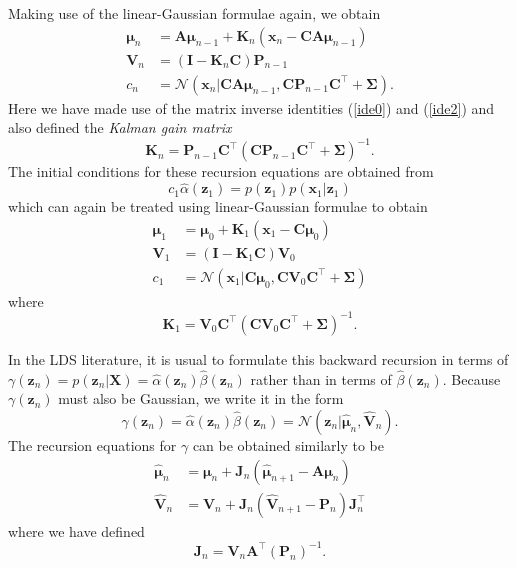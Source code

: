 \documentclass[a4paper]{report}
\renewcommand{\bf}{\mathbf}
\renewcommand{\cal}{\mathcal}
\newcommand{\imp}[1]{{\color{blue}\textit{#1}}}
\newcommand{\bs}{\boldsymbol}
\begin{document}
Making use of the linear-Gaussian formulae again, we obtain
\begin{align}
	\bs{\mu}_n &= \bf{A} \bs{\mu}_{n-1} + \bf{K}_n (\bf{x}_n - \bf{CA}\bs{\mu}_{n-1}) \\
	\bf{V}_n &= (\bf{I}-\bf{K}_n \bf{C})\bf{P}_{n-1} \\
	c_n &= \cal{N}(\bf{x}_n|\bf{CA}\bs{\mu}_{n-1},\bf{CP}_{n-1}\bf{C}^{\intercal} + \bs{\Sigma}).
\end{align}
Here we have made use of the matrix inverse identities (\ref{ide0}) and (\ref{ide2}) and also defined the \imp{Kalman gain matrix}
\begin{equation}
	\bf{K}_n = \bf{P}_{n-1} \bf{C}^{\intercal}(\bf{CP}_{n-1}\bf{C}^{\intercal} + \bs{\Sigma})^{-1}.
\end{equation}
The initial conditions for these recursion equations are obtained from
\begin{equation}
	c_1\hat{\alpha}(\bf{z}_1) = p(\bf{z}_1)p(\bf{x}_1|\bf{z}_1)
\end{equation}
which can again be treated using linear-Gaussian formulae to obtain
\begin{align}
	\bs{\mu}_1 &= \bs{\mu}_0 + \bf{K}_1 (\bf{x}_1-\bf{C}\bs{\mu}_0) \\
	\bf{V}_1 &= (\bf{I}-\bf{K}_1\bf{C})\bf{V}_0 \\
	c_1 &= \cal{N}(\bf{x}_1|\bf{C}\bs{\mu}_0,\bf{CV}_0\bf{C}^{\intercal}+\bs{\Sigma})
\end{align}
where
\begin{equation}
	\bf{K}_1 = \bf{V}_0\bf{C}^{\intercal}(\bf{CV}_0\bf{C}^{\intercal}+\bs{\Sigma})^{-1}.
\end{equation}

In the LDS literature, it is usual to formulate this backward recursion in terms of $\gamma(\bf{z}_n) = p(\bf{z}_n|\bf{X})= \hat{\alpha}(\bf{z}_n)\hat{\beta}(\bf{z}_n)$ rather than in terms of $\hat{\beta}(\bf{z}_n)$. Because $\gamma(\bf{z}_n)$ must also be Gaussian, we write it in the form
\begin{equation}
	\gamma(\bf{z}_n) = \hat{\alpha}(\bf{z}_n)\hat{\beta}(\bf{z}_n)=\cal{N}(\bf{z}_n|\hat{\bs{\mu}}_n,\hat{\bf{V}}_n).
\end{equation}
The recursion equations for $\gamma$ can be obtained similarly to be
\begin{align}
	\hat{\bs{\mu}}_n &= \bs{\mu}_n + \bf{J}_n (\hat{\bs{\mu}}_{n+1}-\bf{A}\bs{\mu}_n) \\
	\hat{\bf{V}}_n &= \bf{V}_n + \bf{J}_n(\hat{\bf{V}}_{n+1}-\bf{P}_n)\bf{J}_n^{\intercal}
\end{align}
where we have defined
\begin{equation}
	\bf{J}_n = \bf{V}_n \bf{A}^{\intercal} (\bf{P}_n)^{-1}.
\end{equation}
\end{document}
